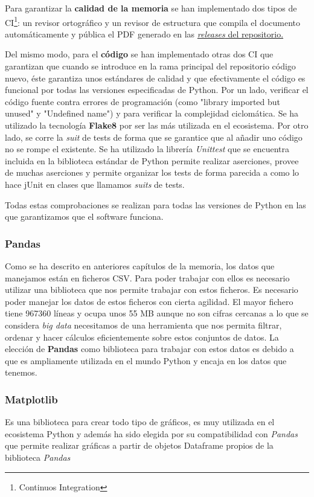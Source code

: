 Para garantizar la \textbf{calidad de la memoria} se han implementado dos tipos de CI\footnote{Continuos Integration}: un revisor ortográfico y un revisor de estructura que compila el documento automáticamente y pública el PDF generado en las \href{https://github.com/pablojjimenez/TFG/releases}{\textit{releases} del repositorio.}

Del mismo modo, para el \textbf{código} se han implementado otras dos CI que garantizan que cuando se introduce en la rama principal del repositorio código nuevo, éste garantiza unos estándares de calidad y que efectivamente el código es funcional por todas las versiones especificadas de Python. Por un lado, verificar el código fuente contra errores de programación (como "library imported but unused" y "Undefined name") y para verificar la complejidad ciclomática. Se ha utilizado la tecnología \textbf{Flake8} por ser las más utilizada en el ecosistema.
Por otro lado, se corre la \textit{suit} de tests de forma que se garantice que al añadir uno código no se rompe el existente. Se ha utilizado la librería \textit{Unittest} que se encuentra incluida en la biblioteca estándar de Python permite realizar aserciones, provee de muchas aserciones y permite organizar los tests de forma parecida a como lo hace jUnit en clases que llamamos \textit{suits} de tests.

Todas estas comprobaciones se realizan para todas las versiones de Python en las que garantizamos que el software funciona.

\subsubsection{Pandas}
Como se ha descrito en anteriores capítulos de la memoria, los datos que manejamos están en ficheros CSV. Para poder trabajar con ellos es necesario utilizar una biblioteca que nos permite trabajar con estos ficheros. Es necesario poder manejar los datos de estos ficheros con cierta agilidad. El mayor fichero tiene 967360 líneas y ocupa unos 55 MB aunque no son cifras cercanas a lo que se considera \textit{big data} necesitamos de una herramienta que nos permita filtrar, ordenar y hacer cálculos eficientemente sobre estos conjuntos de datos. La elección de \textbf{Pandas} como biblioteca para trabajar con estos datos es debido a que es ampliamente utilizada en el mundo Python y encaja en los datos que tenemos.

\subsubsection{Matplotlib}
Es una biblioteca para crear todo tipo de gráficos, es muy utilizada en el ecosistema Python y además ha sido elegida por su compatibilidad con \textit{Pandas} que permite realizar gráficas a partir de objetos Dataframe propios de la biblioteca \textit{Pandas}

